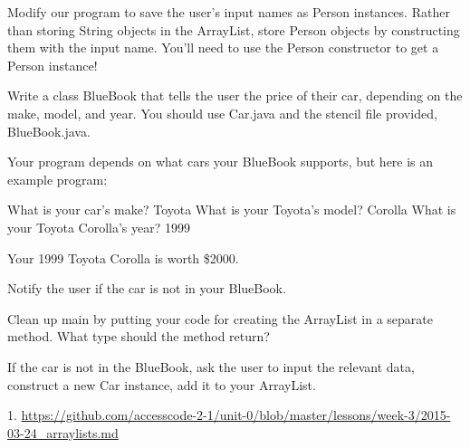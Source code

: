 \begin{example}
Modify our program to save the user's input names as Person instances. Rather than storing String objects in the ArrayList, store Person objects by constructing them with the input name. You'll need to use the Person constructor to get a Person instance!
\end{example}

\exercisesection

\begin{exercise}

Write a class BlueBook that tells the user the price of their car, depending on the make, model, and year. You should use Car.java and the stencil file provided, BlueBook.java.

Your program depends on what cars your BlueBook supports, but here is an example program:

\begin{monospace}
What is your car's make?
Toyota
What is your Toyota's model?
Corolla
What is your Toyota Corolla's year?
1999

Your 1999 Toyota Corolla is worth \$2000.
\end{monospace}

\end{exercise}

\begin{exercise}
Notify the user if the car is not in your BlueBook.
\end{exercise}

\begin{exercise}
Clean up main by putting your code for creating the ArrayList in a separate method. What type should the method return?
\end{exercise}

\begin{exercise}
If the car is not in the BlueBook, ask the user to input the relevant data, construct a new Car instance, add it to your ArrayList.
\end{exercise}


1. \url{https://github.com/accesscode-2-1/unit-0/blob/master/lessons/week-3/2015-03-24_arraylists.md}